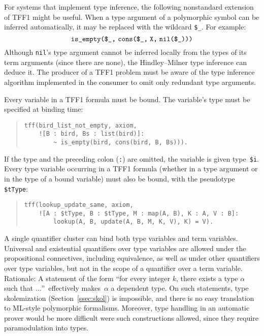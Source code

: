 For systems that implement type inference, the following nonstandard extension
of TFF1 might be useful. When a type argument of
a polymorphic symbol can be inferred automatically, it may be
replaced with the wildcard {\tt \$\_}. For example:
\[\hbox{{\tt is\_empty(\$\_,} {\tt cons(\$\_,\;X,\;nil(\$\_)))}}\]
Although {\tt nil}'s type argument cannot be inferred locally from the types of
its term arguments (since there are none), the Hindley--Milner type inference
can deduce it. The producer of a TFF1 problem must be aware of the type
inference algorithm implemented in the consumer to omit only redundant type
arguments.

Every variable in a TFF1 formula must be bound. The variable's type must be specified
at binding time:
\begin{quote}
\begin{verbatim}
tff(bird_list_not_empty, axiom,
    ![B : bird, Bs : list(bird)]:
        ~ is_empty(bird, cons(bird, B, Bs))).
\end{verbatim}
\end{quote}
If the type and the preceding colon ({\tt :}) are omitted, the variable is given
type~{\tt\$i}. Every type variable occurring in a TFF1 formula
(whether in a type argument or in the type of a bound variable)
must also be bound, with the pseudotype {\tt\$tType}:
\begin{quote}
\begin{verbatim}
tff(lookup_update_same, axiom,
    ![A : $tType, B : $tType, M : map(A, B), K : A, V : B]:
        lookup(A, B, update(A, B, M, K, V), K) = V).
\end{verbatim}
\end{quote}

\pagebreak[2] %

A single quantifier cluster can bind both type variables and term variables.
Universal and existential quantifiers over type variables are allowed under the
propositional connectives, including equivalence, as well as under other
quantifiers over type variables, but not in the scope of a quantifier over a
term variable.
Rationale: A statement of the form ``for every integer $k$, there exists a type
$\alpha$ such that $\ldots$''\ effectively makes~$\alpha$ a dependent type.
On such statements, type skolemization (Section~\ref{ssec:skol}) is impossible,
and there is no easy translation to ML-style polymorphic formalisms.
Moreover, type handling in an automatic prover would be more difficult were
such constructions allowed, since they require paramodulation into types.

